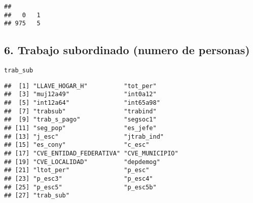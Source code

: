 \documentclass[11pt,]{article}
\newenvironment{Shaded}{\begin{snugshade}}{\end{snugshade}}
\newcommand{\KeywordTok}[1]{\textcolor[rgb]{0.13,0.29,0.53}{\textbf{#1}}}
\newcommand{\DataTypeTok}[1]{\textcolor[rgb]{0.13,0.29,0.53}{#1}}
\newcommand{\DecValTok}[1]{\textcolor[rgb]{0.00,0.00,0.81}{#1}}
\newcommand{\StringTok}[1]{\textcolor[rgb]{0.31,0.60,0.02}{#1}}
\newcommand{\CommentTok}[1]{\textcolor[rgb]{0.56,0.35,0.01}{\textit{#1}}}
\newcommand{\OtherTok}[1]{\textcolor[rgb]{0.56,0.35,0.01}{#1}}
\newcommand{\OperatorTok}[1]{\textcolor[rgb]{0.81,0.36,0.00}{\textbf{#1}}}
\newcommand{\NormalTok}[1]{#1}
\begin{document}
\begin{verbatim}
## 
##   0   1 
## 975   5
\end{verbatim}

\subsection{6. Trabajo subordinado (numero de
personas)}\label{trabajo-subordinado-numero-de-personas}

\texttt{trab\_sub}

\begin{Shaded}
\end{Shaded}

\begin{verbatim}
##  [1] "LLAVE_HOGAR_H"          "tot_per"               
##  [3] "muj12a49"               "int0a12"               
##  [5] "int12a64"               "int65a98"              
##  [7] "trabsub"                "trabind"               
##  [9] "trab_s_pago"            "segsoc1"               
## [11] "seg_pop"                "es_jefe"               
## [13] "j_esc"                  "jtrab_ind"             
## [15] "es_cony"                "c_esc"                 
## [17] "CVE_ENTIDAD_FEDERATIVA" "CVE_MUNICIPIO"         
## [19] "CVE_LOCALIDAD"          "depdemog"              
## [21] "ltot_per"               "p_esc"                 
## [23] "p_esc3"                 "p_esc4"                
## [25] "p_esc5"                 "p_esc5b"               
## [27] "trab_sub"
\end{verbatim}
\end{document}
